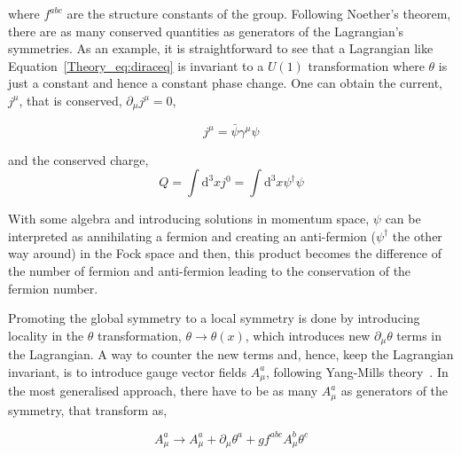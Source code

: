 where $f^{abc}$ are the structure constants of the group. Following Noether's theorem, there are as many conserved quantities as generators of the Lagrangian's symmetries. As an example, it is straightforward to see that a Lagrangian like Equation~\ref{Theory_eq:diraceq} is invariant to a $U(1)$ transformation where $\theta$ is just a constant and hence a constant phase change. One can obtain the current, $j^\mu$, that is conserved, $\partial_\mu j^\mu = 0$,

\begin{equation}
    j^\mu = \bar{\psi}\gamma^\mu\psi
\end{equation}

and the conserved charge,
\begin{equation}
Q=\int \mathrm{d}^3x j^0 = \int \mathrm{d}^3x\psi^{\dag}\psi %
\end{equation}



With some algebra and introducing solutions in momentum space, $\psi$ can be interpreted as annihilating a fermion and creating an anti-fermion ($\psi^\dag$ the other way around) in the Fock space and then, this product becomes the difference of the number of fermion and anti-fermion leading to the conservation of the fermion number.

Promoting the global symmetry to a local symmetry is done by introducing locality in the $\theta$ transformation, $\theta \rightarrow\theta(x)$, which introduces new $\partial_\mu\theta$ terms in the Lagrangian. A way to counter the new terms and, hence, keep the Lagrangian invariant, is to introduce gauge vector fields $A_\mu^a$, following Yang-Mills theory~\cite{YangMills}. In the most generalised approach, there have to be as many $A_\mu^a$ as generators of the symmetry, that transform as,

\begin{equation}
    A_\mu^a \rightarrow A_\mu^a + \partial_\mu\theta^a + gf^{abc}A_\mu^b\theta^c
\end{equation}

